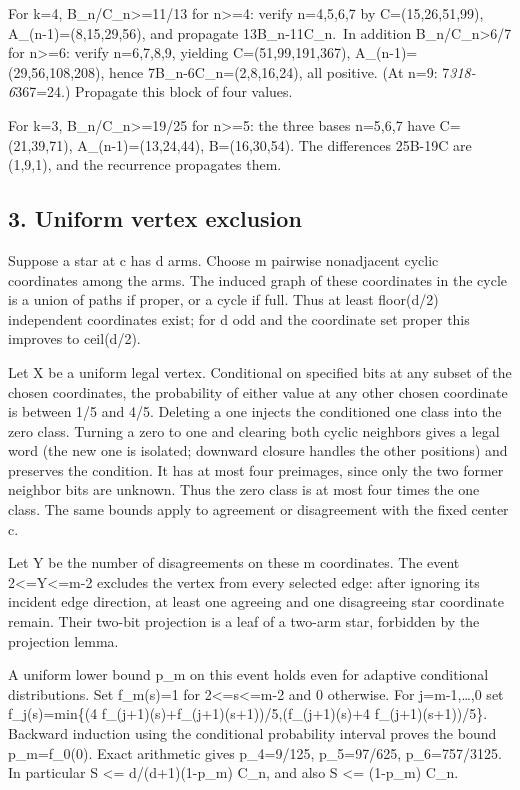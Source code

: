 \documentclass[
  10pt,
]{article}
\begin{document}
For k=4, B\_n/C\_n\textgreater=11/13 for n\textgreater=4: verify
n=4,5,6,7 by C=(15,26,51,99), A\_(n-1)=(8,15,29,56), and propagate
13B\_n-11C\_n.~In addition B\_n/C\_n\textgreater6/7 for n\textgreater=6:
verify n=6,7,8,9, yielding C=(51,99,191,367), A\_(n-1)=(29,56,108,208),
hence 7B\_n-6C\_n=(2,8,16,24), all positive. (At n=9:
7\emph{318-6}367=24.) Propagate this block of four values.

For k=3, B\_n/C\_n\textgreater=19/25 for n\textgreater=5: the three
bases n=5,6,7 have C=(21,39,71), A\_(n-1)=(13,24,44), B=(16,30,54). The
differences 25B-19C are (1,9,1), and the recurrence propagates them.

\subsection{3. Uniform vertex exclusion}\label{uniform-vertex-exclusion}

Suppose a star at c has d arms. Choose m pairwise nonadjacent cyclic
coordinates among the arms. The induced graph of these coordinates in
the cycle is a union of paths if proper, or a cycle if full. Thus at
least floor(d/2) independent coordinates exist; for d odd and the
coordinate set proper this improves to ceil(d/2).

Let X be a uniform legal vertex. Conditional on specified bits at any
subset of the chosen coordinates, the probability of either value at any
other chosen coordinate is between 1/5 and 4/5. Deleting a one injects
the conditioned one class into the zero class. Turning a zero to one and
clearing both cyclic neighbors gives a legal word (the new one is
isolated; downward closure handles the other positions) and preserves
the condition. It has at most four preimages, since only the two former
neighbor bits are unknown. Thus the zero class is at most four times the
one class. The same bounds apply to agreement or disagreement with the
fixed center c.

Let Y be the number of disagreements on these m coordinates. The event
2\textless=Y\textless=m-2 excludes the vertex from every selected edge:
after ignoring its incident edge direction, at least one agreeing and
one disagreeing star coordinate remain. Their two-bit projection is a
leaf of a two-arm star, forbidden by the projection lemma.

A uniform lower bound p\_m on this event holds even for adaptive
conditional distributions. Set f\_m(s)=1 for 2\textless=s\textless=m-2
and 0 otherwise. For j=m-1,\ldots,0 set f\_j(s)=min\{(4
f\_(j+1)(s)+f\_(j+1)(s+1))/5,(f\_(j+1)(s)+4 f\_(j+1)(s+1))/5\}. Backward
induction using the conditional probability interval proves the bound
p\_m=f\_0(0). Exact arithmetic gives p\_4=9/125, p\_5=97/625,
p\_6=757/3125. In particular \textbar S\textbar{} \textless=
d/(d+1)(1-p\_m) C\_n, and also \textbar S\textbar{} \textless= (1-p\_m)
C\_n.
\end{document}
